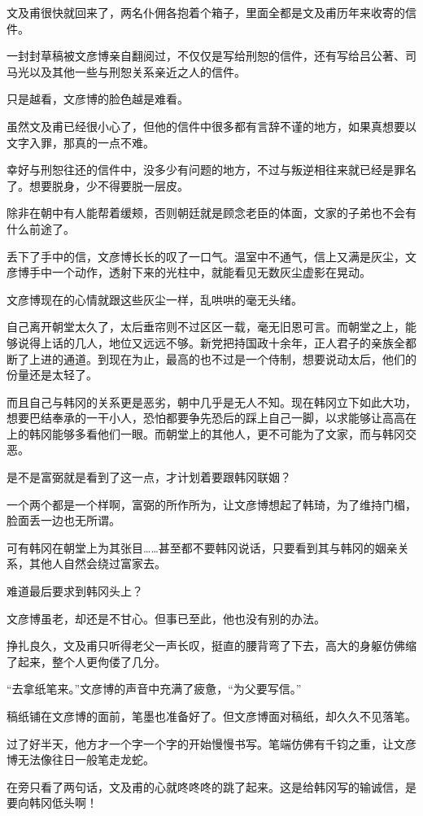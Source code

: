 文及甫很快就回来了，两名仆佣各抱着个箱子，里面全都是文及甫历年来收寄的信件。

一封封草稿被文彦博亲自翻阅过，不仅仅是写给刑恕的信件，还有写给吕公著、司马光以及其他一些与刑恕关系亲近之人的信件。

只是越看，文彦博的脸色越是难看。

虽然文及甫已经很小心了，但他的信件中很多都有言辞不谨的地方，如果真想要以文字入罪，那真的一点不难。

幸好与刑恕往还的信件中，没多少有问题的地方，不过与叛逆相往来就已经是罪名了。想要脱身，少不得要脱一层皮。

除非在朝中有人能帮着缓颊，否则朝廷就是顾念老臣的体面，文家的子弟也不会有什么前途了。

丢下了手中的信，文彦博长长的叹了一口气。温室中不通气，信上又满是灰尘，文彦博手中一个动作，透射下来的光柱中，就能看见无数灰尘虚影在晃动。

文彦博现在的心情就跟这些灰尘一样，乱哄哄的毫无头绪。

自己离开朝堂太久了，太后垂帘则不过区区一载，毫无旧恩可言。而朝堂之上，能够说得上话的几人，地位又远远不够。新党把持国政十余年，正人君子的亲族全都断了上进的通道。到现在为止，最高的也不过是一个侍制，想要说动太后，他们的份量还是太轻了。

而且自己与韩冈的关系更是恶劣，朝中几乎是无人不知。现在韩冈立下如此大功，想要巴结奉承的一干小人，恐怕都要争先恐后的踩上自己一脚，以求能够让高高在上的韩冈能够多看他们一眼。而朝堂上的其他人，更不可能为了文家，而与韩冈交恶。

是不是富弼就是看到了这一点，才计划着要跟韩冈联姻？

一个两个都是一个样啊，富弼的所作所为，让文彦博想起了韩琦，为了维持门楣，脸面丢一边也无所谓。

可有韩冈在朝堂上为其张目……甚至都不要韩冈说话，只要看到其与韩冈的姻亲关系，其他人自然会绕过富家去。

难道最后要求到韩冈头上？

文彦博虽老，却还是不甘心。但事已至此，他也没有别的办法。

挣扎良久，文及甫只听得老父一声长叹，挺直的腰背弯了下去，高大的身躯仿佛缩了起来，整个人更佝偻了几分。

“去拿纸笔来。”文彦博的声音中充满了疲惫，“为父要写信。”

稿纸铺在文彦博的面前，笔墨也准备好了。但文彦博面对稿纸，却久久不见落笔。

过了好半天，他方才一个字一个字的开始慢慢书写。笔端仿佛有千钧之重，让文彦博无法像往日一般笔走龙蛇。

在旁只看了两句话，文及甫的心就咚咚咚的跳了起来。这是给韩冈写的输诚信，是要向韩冈低头啊！

